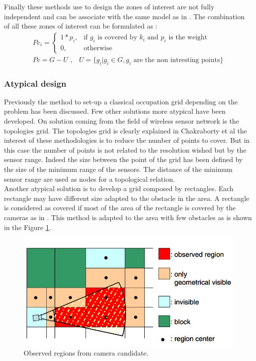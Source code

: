 Finally  these methods use to design the zones of interest are not fully independent and can be associate with the same model as in \cite{141*akbarzadeh2013,171*horster2006,84*xu2011}. The combination of all these  zones of interest can be formulated as : 
 \begin{align}\label{eq:PcFull}
Pc_i= \begin{cases} 1*p_i, & \mbox{if } g_i\mbox{ is covered  by $k_i$ and  $p_i$ is the weight} \\ 0, & \mbox{otherwise}  \end{cases}
\\ Pc=G-U \mbox{ ,    }  \mbox{ }U= \{ g_i | g_i \in G, g_i \mbox{ are the non intresting points} \}
\end{align}

   
\subsubsection{Atypical design}  

Previously the method to set-up a classical occupation grid depending on the problem has been discussed. Few other solutions more atypical have been developed. On solution coming from the field of wireless sensor network is the topologies grid. 
 The topologies grid is clearly explained in Chakraborty et al \cite{150*chakrabarty2002} the interest of these methodologies is to reduce the number of points to cover. But in this case the number of points is not related to the resolution wished  but by the sensor range. Indeed the size between the point of the grid has been defined by the size of the minimum range of the sensors. The distance of the minimum sensor range are used as nodes for a topological relation. \\
Another atypical solution is to develop a grid composed by rectangles. Each rectangle may have different size adapted to the obstacle in the area. A rectangle is considered as covered if most of the area of the rectangle is covered by the cameras as in \citep{170*yabuta2008}. This method is adapted to the area with few obstacles as is shown in the Figure \ref{fig:from170}.
\begin{figure}[t!]
\begin{center}
   \includegraphics[width=\linewidth]{img/from170.png}
  \caption{ Observed regions from camera candidate.}\label{fig:from170}
  \endminipage\hfill
  \end{center}
\end{figure}

